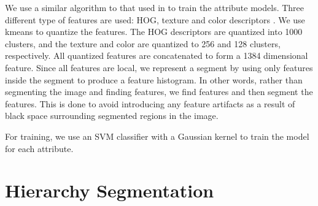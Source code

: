 \documentclass[10pt,twocolumn,letterpaper]{article}
\begin{document}
We use a similar algorithm to that used in \cite{farhadi09} to train the attribute models. 
Three different type of features are used: HOG, texture and color descriptors \cite{farhadi09}.  
We use kmeans to quantize the features. The HOG descriptors are quantized into 1000 clusters, 
and the texture and color are quantized to 256 and 128 clusters, respectively. 
All quantized features are concatenated to form a 1384 dimensional feature.
Since all features are local, we represent a segment by using only features inside the segment
to produce a feature histogram.  In other words, rather than segmenting the image and finding features,
we find features and then segment the features.
This is done to avoid introducing any feature artifacts as a result of black space surrounding 
segmented regions in the image.

For training, we use an SVM classifier with a Gaussian kernel to train
the model for each attribute.  




\section{Hierarchy Segmentation}
\label{sec:segmentation}
\end{document}
